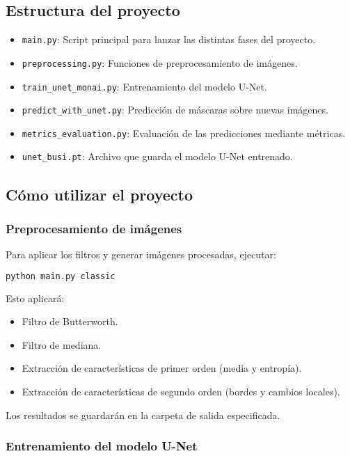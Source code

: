 \documentclass[12pt]{article}
\begin{document}
\subsection{Estructura del proyecto}

\begin{itemize}
    \item \texttt{main.py}: Script principal para lanzar las distintas fases del proyecto.
    \item \texttt{preprocessing.py}: Funciones de preprocesamiento de imágenes.
    \item \texttt{train\_unet\_monai.py}: Entrenamiento del modelo U-Net.
    \item \texttt{predict\_with\_unet.py}: Predicción de máscaras sobre nuevas imágenes.
    \item \texttt{metrics\_evaluation.py}: Evaluación de las predicciones mediante métricas.
    \item \texttt{unet\_busi.pt}: Archivo que guarda el modelo U-Net entrenado.
\end{itemize}

\subsection{Cómo utilizar el proyecto}

\subsubsection{Preprocesamiento de imágenes}

Para aplicar los filtros y generar imágenes procesadas, ejecutar:

\begin{lstlisting}[language=bash]
python main.py classic
\end{lstlisting}

Esto aplicará:
\begin{itemize}
    \item Filtro de Butterworth.
    \item Filtro de mediana.
    \item Extracción de características de primer orden (media y entropía).
    \item Extracción de características de segundo orden (bordes y cambios locales).
\end{itemize}

Los resultados se guardarán en la carpeta de salida especificada.

\subsubsection{Entrenamiento del modelo U-Net}
\end{document}
